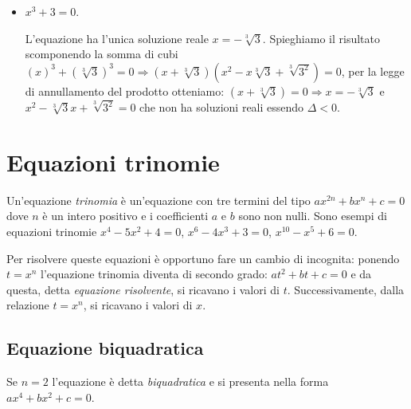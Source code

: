 \begin{exrig}
\begin{esempio}
\begin{itemize}
\item $x^3+3=0$.

L’equazione ha l’unica soluzione reale $x=-\sqrt[3]3$. Spieghiamo il risultato scomponendo la somma di cubi $\left(x\right)^3+\left(\sqrt[3]3\right)^3=0 \Rightarrow \left(x+\sqrt[3]3\right) \left(x^2-x\sqrt[3]3+\sqrt[3]{3^2}\right)=0$, per la legge di annullamento del prodotto otteniamo: $\left(x+\sqrt[3]3\right)=0 \Rightarrow x=-\sqrt[3] 3$ e $x^2-\sqrt[3]3 x+\sqrt[3]{3^2}=0$ che non ha soluzioni reali essendo $\Delta <0$.
\end{itemize}
 \end{esempio}
\end{exrig}
\ovalbox{\risolvii \ref{ese:5.12}, \ref{ese:5.13}, \ref{ese:5.14}, \ref{ese:5.15}, \ref{ese:5.16}, \ref{ese:5.17}, \ref{ese:5.18}, \ref{ese:5.19}, \ref{ese:5.20}}

\section{Equazioni trinomie}
Un’equazione \emph{trinomia} è un’equazione con tre termini del tipo $ax^{2n}+bx^n+c=0$ dove $n$ è un intero positivo e i coefficienti $a$ e $b$ sono non nulli. Sono esempi di equazioni trinomie $x^4-5x^2+4=0$, $x^6-4x^3+3=0$, $x^{10}-x^5+6=0$.

Per risolvere queste equazioni è opportuno fare un cambio di incognita: ponendo $t=x^n$ l’equazione trinomia diventa di secondo grado: $at^2+bt+c=0$ e da questa, detta \emph{equazione risolvente}, si ricavano i valori di $t$. Successivamente, dalla relazione $t=x^n$, si ricavano i valori di $x$.

\subsection{Equazione biquadratica}
Se $n=2$ l’equazione è detta \emph{biquadratica} e si presenta nella forma \ $ax^4+bx^2+c=0$.

